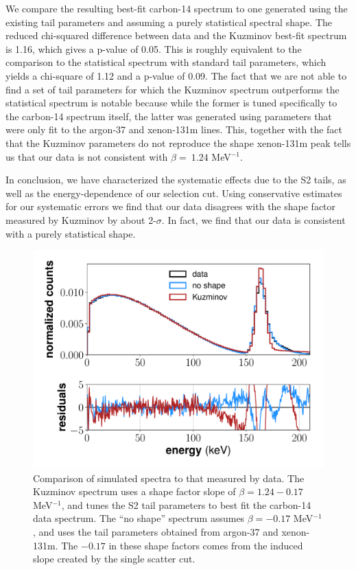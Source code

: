 We compare the resulting best-fit carbon-14 spectrum to one generated using the existing tail parameters and assuming a purely statistical spectral shape. The reduced chi-squared difference between data and the Kuzminov best-fit spectrum is 1.16, which gives a p-value of 0.05. This is roughly equivalent to the comparison to the statistical spectrum with standard tail parameters, which yields a chi-square of 1.12 and a p-value of 0.09. The fact that we are not able to find a set of tail parameters for which the Kuzminov spectrum outperforms the statistical spectrum is notable because while the former is tuned specifically to the carbon-14 spectrum itself, the latter was generated using parameters that were only fit to the argon-37 and xenon-131m lines. This, together with the fact that the Kuzminov parameters do not reproduce the shape xenon-131m peak tells us that our data is not consistent with $\beta = \ 1.24$ MeV$^{-1}$.

In conclusion, we have characterized the systematic effects due to the S2 tails, as well as the energy-dependence of our selection cut. Using conservative estimates for our systematic errors we find that our data disagrees with the shape factor measured by Kuzminov by about 2-$\sigma$. In fact, we find that our data is consistent with a purely statistical shape. 
\begin{figure}[!h]
\centering
  \includegraphics[width=\textwidth]{Figures/C14_spectrum_shapecomp.pdf}
\caption{Comparison of simulated spectra to that measured by data. The Kuzminov spectrum uses a shape factor slope of $\beta=1.24-0.17$ MeV$^{-1}$, and tunes the S2 tail parameters to best fit the carbon-14 data spectrum. The ``no shape'' spectrum assumes $\beta=-0.17$ MeV$^{-1}$, and uses the tail parameters obtained from argon-37 and xenon-131m. The $-0.17$ in these shape factors comes from the induced slope created by the single scatter cut.}
\label{fig:C14_shape}
\end{figure}



